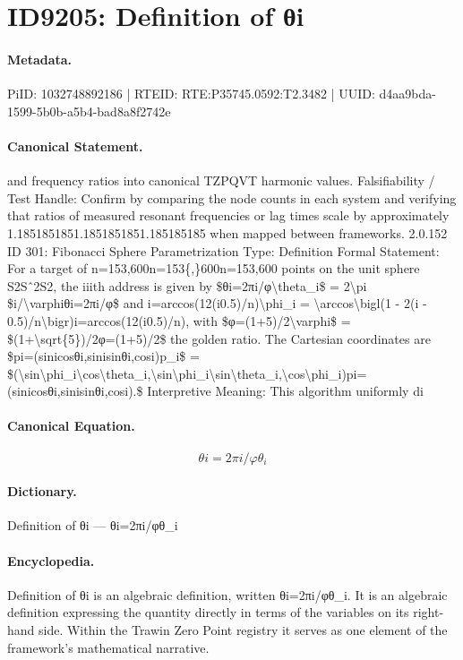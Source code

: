 \section*{ID9205: Definition of θi}
\paragraph{Metadata.}
PiID: 1032748892186 | RTEID: RTE:P35745.0592:T2.3482 | UUID: d4aa9bda-1599-5b0b-a5b4-bad8a8f2742e

\paragraph{Canonical Statement.}
and frequency ratios into canonical TZPQVT harmonic values. Falsifiability / Test Handle: Confirm by comparing the node counts in each system and verifying that ratios of measured resonant frequencies or lag times scale by approximately 1.1851851851.1851851851.185185185 when mapped between frameworks. 2.0.152 ID 301: Fibonacci Sphere Parametrization Type: Definition Formal Statement: For a target of n=153,600n=153\{,\}600n=153,600 points on the unit sphere S2Sˆ2S2, the iiith address is given by \$θi=2πi/φ\textbackslash{}theta\_i\$ = 2\textbackslash{}pi \$i/\textbackslash{}varphiθi=2πi/φ\$ and i=arccos(12(i0.5)/n)\textbackslash{}phi\_i = \textbackslash{}arccos\textbackslash{}bigl(1 - 2(i - 0.5)/n\textbackslash{}bigr)i=arccos(12(i0.5)/n), with \$φ=(1+5)/2\textbackslash{}varphi\$ = \$(1+\textbackslash{}sqrt\{5\})/2φ=(1+5)/2\$ the golden ratio. The Cartesian coordinates are \$pi=(sinicosθi,sinisinθi,cosi)p\_i\$ = \$(\textbackslash{}sin\textbackslash{}phi\_i\textbackslash{}cos\textbackslash{}theta\_i,\textbackslash{}sin\textbackslash{}phi\_i\textbackslash{}sin\textbackslash{}theta\_i,\textbackslash{}cos\textbackslash{}phi\_i)pi=(sinicosθi,sinisinθi,cosi).\$ Interpretive Meaning: This algorithm uniformly di

\paragraph{Canonical Equation.}
\[
θi=2πi/φ\theta_i
\]

\paragraph{Dictionary.}
Definition of θi — θi=2πi/φθ\_i

\paragraph{Encyclopedia.}
Definition of θi is an algebraic definition, written θi=2πi/φθ\_i. It is an algebraic definition expressing the quantity directly in terms of the variables on its right-hand side. Within the Trawin Zero Point registry it serves as one element of the framework's mathematical narrative.
